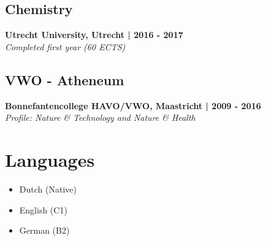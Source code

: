\documentclass[a4paper,10pt]{article}
\begin{document}
\subsection*{Chemistry}
\textbf{Utrecht University, Utrecht | 2016 - 2017} \\
\textit{Completed first year (60 ECTS)}

\subsection*{VWO - Atheneum}
\textbf{Bonnefantencollege HAVO/VWO, Maastricht | 2009 - 2016} \\
\textit{Profile: Nature \& Technology and Nature \& Health}

\section*{Languages}
\begin{itemize}
    \item Dutch (Native)
    \item English (C1)
    \item German (B2)
\end{itemize}
\end{document}
